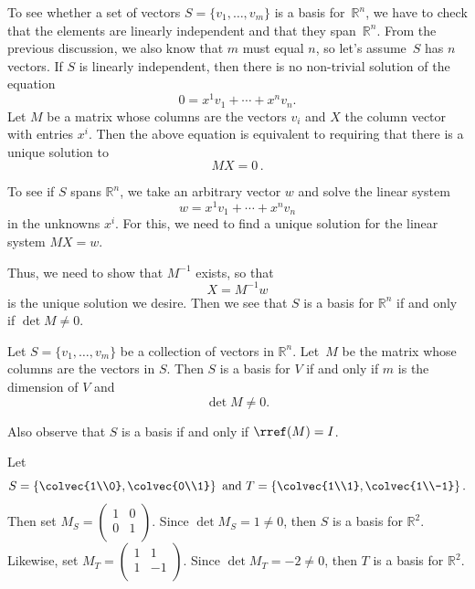 To see whether a set of vectors $S=\{v_1, \ldots, v_m \}$ is a basis for~$\mathbb{R}^n$, we have to check that the elements  are linearly independent and that they span~$\mathbb{R}^n$.  From the previous discussion, we also know that $m$ must equal $n$, so let's assume~$S$ has $n$ vectors.
If $S$ is linearly independent, then there is no non-trivial solution of the equation
\[
0 = x^1v_1+\cdots + x^nv_n.
\]
Let $M$ be a matrix whose columns are the vectors $v_i$ and $X$ the column vector with entries $x^i$.  Then the above equation is equivalent to requiring that there is a unique solution to \[MX=0\, .\]

To see if $S$ spans $\mathbb{R}^n$, we take an arbitrary vector $w$ and solve the linear system
\[
w=x^1v_1+\cdots + x^nv_n
\]
in the unknowns $x^i$.  For this, we need to find a unique solution for the linear system $MX=w$.  

Thus, we need to show that $M^{-1}$ exists, so that 
\[
X=M^{-1}w
\]
is the unique solution we desire.  Then we see that $S$ is a basis for $\mathbb{R}^n$ if and only if $\det M\neq 0$.




\begin{theorem}
Let $S=\{v_1, \ldots, v_m \}$ be a collection of vectors in $\mathbb{R}^n$.  Let~$M$ be the matrix whose columns are the vectors in $S$.  Then $S$ is a basis for $V$ if and only if $m$ is the dimension of $V$ and 
\[
\det M \neq 0.
\]
\end{theorem}

\begin{remark}
Also observe that  $S$ is a basis if and only if $\rref(M)=I$.
\end{remark}

\begin{example}
Let 
\[
S=\left\{ \colvec{1\\0}, \colvec{0\\1} \right\} \text{ and }
T=\left\{ \colvec{1\\1}, \colvec{1\\-1} \right\}.
\]
Then set $M_S=\begin{pmatrix}
1 & 0\\
0 & 1\\
\end{pmatrix}$.  Since $\det M_S=1\neq 0$, then $S$ is a basis for $\mathbb{R}^2$.\\

\noindent
Likewise, set $M_T=\begin{pmatrix}
1 & 1\\
1 & -1\\
\end{pmatrix}$.  Since $\det M_T=-2\neq 0$, then $T$ is a basis for $\mathbb{R}^2$.
\end{example}


